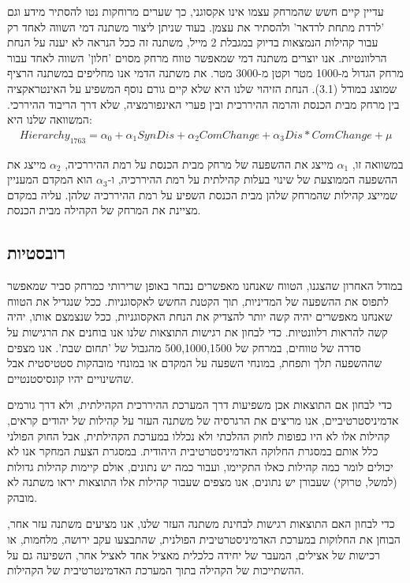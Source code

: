 	
עדיין קיים חשש שהמרחק עצמו אינו אקסוגני, כך שערים מרוחקות נטו להסתיר מידע וגם 'לרדת מתחת לרדאר' ולהסתיר את עצמן. בעוד שניתן ליצור משתנה דמי השווה לאחד רק עבור קהילות הנמצאות בדיוק במגבלת 2 מייל, משתנה זה ככל הנראה לא יענה על הנחת הרלוונטיות. אנו יוצרים משתנה דמי שמאפשר טווח מרחק מסוים 'חלון' השווה לאחד עבור מרחק הגדול מ-1000 מטר וקטן מ-3000 מטר. את משתנה הדמי אנו מחליפים במשתנה הרציף שמוצג במודל (3.1). הנחת הזיהוי שלנו היא שלא קיים גורם נוסף המשפיע על האינטראקציה בין מרחק מבית הכנסת והרמה ההיררכית ובין פערי האינפורמציה, שלא דרך הריבוד ההיררכי.
המשוואה שלנו היא:
\begin{align}
Hierarchy_{1763} = \alpha_0 + \alpha_1 SynDis + \alpha_2 ComChange + \alpha_3 Dis * ComChange + \mu
\end{align}
 

במשוואה זו, $\alpha_1$ מייצג את ההשפעה של מרחק מבית הכנסת על רמת ההיררכיה, $\alpha_2$ מייצג את ההשפעה הממוצעת של שינוי בעלות קהילתית על רמת ההיררכיה, ו-$\alpha_3$ הוא המקדם המעניין שמייצג קהילות שהמרחק שלהן מבית הכנסת השפיע על רמת ההיררכיה שלהן. עליה במקדם מציינת את המרחק של הקהילה מבית הכנסת.


\subsection{רובסטיות}

במודל האחרון שהצגנו, הטווח שאנחנו מאפשרים נבחר באופן שרירותי כמרחק סביר שמאפשר לתפוס את ההשפעה של המדיניות, תוך הקטנת החשש לאקסוגניות. ככל שנגדיל את הטווח שאנחנו מאפשרים יהיה קשה יותר להצדיק את הנחת האקסוגניות, ככל שנצמצם אותו, יהיה קשה להראות רלוונטיות. כדי לבחון את רגישות התוצאות שלנו אנו בוחנים את הרגישות על סדרה של טווחים, במרחק של 500,1000,1500 מהגבול של 'תחום שבת'. אנו מצפים שההשפעה תלך ותפחת, במונחי השפעה על המקדם או במונחי מובהקות סטטיסטית אבל שהשינויים יהיו קונסיסטנטיים. 

כדי לבחון אם התוצאות אכן משפיעות דרך המערכת ההיררכית הקהילתית, ולא דרך גורמים אדמיניסטרטיביים, אנו מריצים את הרגרסיה של משתנה העזר על קהילות של יהודים קראים, קהילות אלו לא היו כפופות לחוק ההלכתי ולא נכללו במערכת הקהילתית, אבל החוק הפולני כלל אותם במסגרת החלוקה האדמיניסטרטיבית היהודית. במסגרת הצעת המחקר אנו לא יכולים לומר כמה קהילות כאלו התקיימו, ועבור כמה יש נתונים, אולם קיימות קהילות גדולות (למשל, טרוקי) שעבורן יש נתונים, אנו מצפים שעבור קהילות אלו התוצאות יראו משתנה לא מובהק.

כדי לבחון האם התוצאות רגישות לבחינת משתנה העזר שלנו, אנו מציעים משתנה עזר אחר, הבוחן את החלוקות במערכת האדמיניסטרטיבית הפולנית, שהתבצעו עקב ירושה, מלחמות, או רכישות של אצילים, המעבר של יחידה כלכלית מאציל אחד לאציל אחר, השפיעה גם על ההשתייכות של הקהילה בתוך המערכת האדמינטרטיבית של הקהילות. 

